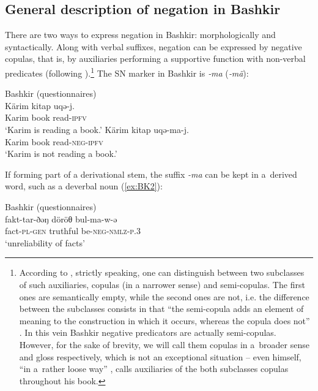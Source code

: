 \documentclass[output=paper]{langsci/langscibook}
\begin{document}
\subsection{General description of negation in Bashkir}\label{sec:BK2.1}

There are two ways to express negation in Bashkir: morphologically and syntactically. Along with verbal suffixes, negation can be expressed by negative copulas, that is, by auxiliaries performing a supportive function with non-verbal predicates (following \citealp{hengeveld1992a}).\footnote{According to \citeauthor{hengeveld1992a}, strictly speaking, one can distinguish between two subclasses of such auxiliaries, copulas (in a narrower sense) and semi-copulas. The first ones are semantically empty, while the second ones are not, i.e. the difference between the subclasses consists in that “the semi-copula adds an element of meaning to the construction in which it occurs, whereas the copula does not” \citeyearpar[35]{hengeveld1992a}. In this vein Bashkir negative predicators are actually semi-copulas. However, for the sake of brevity, we will call them copulas in a broader sense and gloss respectively, which is not an exceptional situation – even \citeauthor{hengeveld1992a} himself, “in a rather loose way” \citeyearpar[32]{hengeveld1992a}, calls auxiliaries of the both subclasses copulas throughout his book.} The SN marker in Bashkir is \textit{‑ma} (\textit{‑mä}):

\ea Bashkir (questionnaires)\footnotemark \label{ex:BK1}\\
  \ea
	\gll Kärim	kitap	uqə-j.\\
	Karim		book	read-\textsc{ipfv}\\
	\glt `Karim is reading a book.'
  \ex
	\gll Kärim	kitap	uqə-ma-j.\\
	Karim		book	read-\textsc{neg-ipfv}\\
	\glt `Karim is not reading a book.'
\z \z


If forming part of a derivational stem, the suffix \textit{-ma} can be kept in a derived word, such as a deverbal noun (\ref{ex:BK2}):

\ea Bashkir (questionnaires) \label{ex:BK2}\\
	\gll fakt-tar-ðəŋ	döröθ	bul-ma-w-ə\\
	fact-\textsc{pl-gen}	truthful	be-\textsc{neg-nmlz-p.3}\\
	\glt `unreliability of facts'
\z
\end{document}
